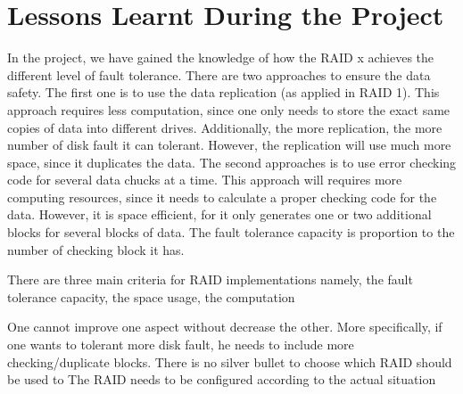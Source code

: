\section{Lessons Learnt During the Project}
In the project, we have gained the knowledge of how the RAID x achieves the different level of fault tolerance. There are two approaches to ensure the data safety. The first one is to use the data replication (as applied in RAID 1). This approach requires less computation, since one only needs to store the exact same copies of data into different drives. Additionally, the more replication, the more number of disk fault it can tolerant. However, the replication will use much more space, since it duplicates the data. The second approaches is to use error checking code for several  data chucks at a time. This approach will requires more computing resources, since it needs to calculate a proper checking code for the data. However, it is space efficient, for it only generates one or two additional blocks for several blocks of data. The fault tolerance capacity is proportion to the number of checking block it has. 

There are three main criteria for RAID implementations namely, the fault tolerance capacity, the space usage, the computation

One cannot improve one aspect without decrease the other. More specifically, if one wants to tolerant more disk fault, he needs to include more checking/duplicate blocks. There is no silver bullet to choose which RAID should be used to The RAID needs to be configured according to the actual situation

